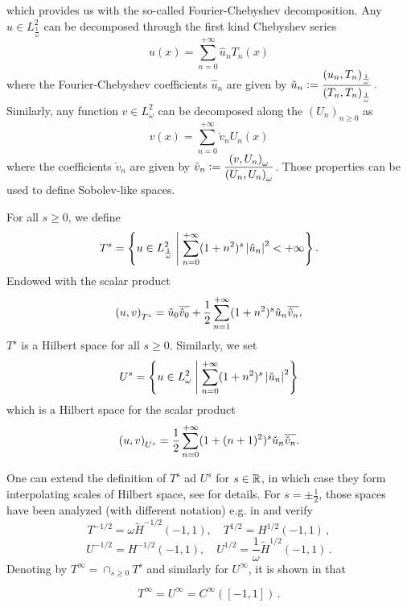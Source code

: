 \documentclass[a4paper]{subfiles}
\begin{document}
which provides us with the so-called Fourier-Chebyshev decomposition. Any
$u\in L^2_{\frac{1}{\omega}}$ can be decomposed through the first kind Chebyshev series 
\begin{equation}
	u(x) = \sum_{n=0}^{+\infty} \hat{u}_n T_n(x)
	\label{FCseries}
\end{equation}
where the Fourier-Chebyshev coefficients $\hat{u}_n$ are given by $\hat{u}_n \mathrel{\mathop:}= \dfrac{\left( u_n,T_n\right)_\frac{1}{\omega}}{\left( T_n,T_n\right)_\frac{1}{\omega}}\,.$
Similarly, any 
function $v\in L^2_{\omega}$ can be decomposed along the $(U_n)_{n\geq 0}$ as
\[ v(x) = \sum_{n=0}^{+\infty} \check{v}_n U_n(x)\]
where the coefficients $\check{v}_n$ are given by $\check{v}_n \mathrel{\mathop:}= 
\dfrac{\left( v,U_n\right)_{\omega}}{\left( U_n,U_n\right)_\omega}$.
Those properties can be used to define Sobolev-like spaces. 
\begin{definition}
	For all $s \geq 0$, we define 
	\[T^s = \left\{ u \in L^2_\frac{1}{\omega}\mathrel{}\middle|\mathrel{} \sum_{n=0}^{+\infty}(1+n^2)^s \left\lvert \hat{u}_n \right\rvert^2 < + \infty\right\}.\]
	Endowed with the scalar product
	\[\left( u,v\right)_{T^s} = \hat{u}_0 \overline{\hat{v}_0} + \frac{1}{2}\sum_{n=1}^{+\infty}(1+n^2)^s\hat{u}_n \overline{\hat{v}_n},\]
	$T^s$ is a Hilbert space for all $s \geq 0$. 
	Similarly, we set
	\[U^s = \left\{u \in L^2_\omega\mathrel{}\middle|\mathrel{} \sum_{n=0}^{+\infty} (1 + n^2)^s\left\lvert \check{u}_n \right\rvert^2\right\}\]
	which is a Hilbert space for the scalar product
	\[\left( u,v\right)_{U^s} = \frac{1}{2} \sum_{n=0}^{+ \infty} (1 + (n+1)^2)^s\check{u}_n\overline{\check{v}_n}.\]
\end{definition}
One can extend the definition of $T^s$ ad $U^s$ for $s\in \mathbb{R}$, in which case they form interpolating scales of Hilbert space, see \cite{averseng} for details.  For $s = \pm \frac{1}{2}$, those spaces 
have been analyzed (with different notation) e.g. in \cite{jerez2012explicit} and verify
\begin{equation}
\label{lemJerez1}
T^{-1/2} = {\omega} \tilde{H}^{-1/2}(-1,1), \quad T^{1/2} = H^{1/2}(-1,1)\,,
\end{equation}
\begin{equation}
\label{lemJerez2}
U^{-1/2} = H^{-1/2}(-1,1), \quad U^{1/2} = \frac{1}{\omega }\tilde{H}^{1/2}(-1,1)\,.
\end{equation}
Denoting by $T^\infty = \cap_{s \geq 0} T^s$ and similarly for $U^\infty$, it is shown in \cite{averseng} that
\begin{lemma}
	\[T^{\infty} = U^{\infty} = C^{\infty}([-1,1])\,.\]
	\label{LemTinfCinf}
\end{lemma}
\end{document}
